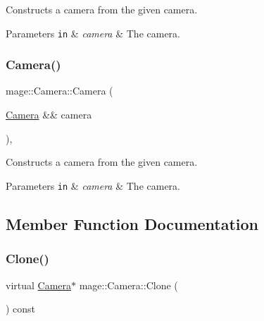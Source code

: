Constructs a camera from the given camera.


\begin{DoxyParams}[1]{Parameters}
\mbox{\tt in}  & {\em camera} & The camera. \\
\hline
\end{DoxyParams}
\hypertarget{classmage_1_1_camera_a595d9c89176aac92bbd58f4117c05ea9}{}\label{classmage_1_1_camera_a595d9c89176aac92bbd58f4117c05ea9} 
\subsubsection{\texorpdfstring{Camera()}{Camera()}\hspace{0.1cm}{\footnotesize\ttfamily [3/3]}}
{\footnotesize\ttfamily mage\+::\+Camera\+::\+Camera (\begin{DoxyParamCaption}\item[{\hyperlink{classmage_1_1_camera}{Camera} \&\&}]{camera }\end{DoxyParamCaption})\hspace{0.3cm}{\ttfamily [protected]}, {\ttfamily [default]}}

Constructs a camera from the given camera.


\begin{DoxyParams}[1]{Parameters}
\mbox{\tt in}  & {\em camera} & The camera. \\
\hline
\end{DoxyParams}


\subsection{Member Function Documentation}
\hypertarget{classmage_1_1_camera_a19301c2256c183db50b5e9406f7b5f3c}{}\label{classmage_1_1_camera_a19301c2256c183db50b5e9406f7b5f3c} 
\subsubsection{\texorpdfstring{Clone()}{Clone()}}
{\footnotesize\ttfamily virtual \hyperlink{classmage_1_1_camera}{Camera}$\ast$ mage\+::\+Camera\+::\+Clone (\begin{DoxyParamCaption}{ }\end{DoxyParamCaption}) const\hspace{0.3cm}{\ttfamily [pure virtual]}}

